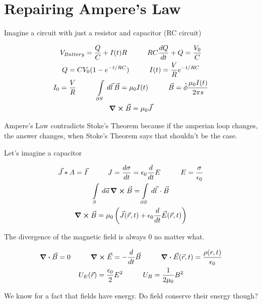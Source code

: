 \documentclass[fleqn]{report}
\newcommand{\hp}{\hspace{1cm}}
\newcommand{\del}{\partial}
\newcommand{\equations} [1] {
\begin{gather*}
#1
\end{gather*}
}
\begin{document}
\section{Repairing Ampere's Law}
Imagine a circuit with just a resistor and capacitor (RC circuit)

\equations{
    V_{Battery}
    = 
    \frac{Q}{C}
    +
    I(t) R 
    \hp 
    RC \frac{dQ}{dt} 
    + Q 
    =
    \frac{V_0}{C}
    \\
    Q 
    =
    C V_0 
    (1 - e^{-t / RC})
    \hp 
    I(t) 
    =
    \frac{V}{R} 
    e^{-t / RC}
    \\
    I_0 = \frac{V}{R} 
    \hp 
    \int\limits_{\del S} \, d \vec l \, 
    \vec B 
    =
    \mu_0 I(t) 
    \hp
    \vec B 
    =
    \hat \phi
    \frac{\mu_0 I(t)}{2 \pi s }
    \\
    \curl \vec B 
    =
    \mu_0 \vec J 
}


Ampere's Law contradicts Stoke's Theorem because if the amperian loop changes, the 
answer changes, when Stoke's Theorem says that shouldn't be the case. 

Let's imagine a capacitor 
\equations{
    \vec J * A 
    =
    \vec I 
    \hp 
    J 
    =
    \frac{d \sigma}{dt}
    =
    \epsilon_0 
    \frac{d}{dt}
    E 
    \hp 
    E = \frac{\sigma}{\epsilon_0}
    \\
    \int\limits_S \, d\vec a \,
    \curl \vec B 
    =
    \int\limits_{\del S} \, d \vec l \, 
    \cdot \vec B 
    \\
    \curl \vec B 
    = 
    \mu_0 
    \left( 
        \vec J(\vec r, t)
        +
        \epsilon_0 
        \frac{d}{dt}
        \vec E(\vec r, t)
    \right)
}

The divergence of the magnetic field is always $0$ no matter what. 

\equations{
    \div \vec B = 0 
    \hp
    \curl \vec E 
    =
    -
    \frac{d}{dt}
    \vec B 
    \hp 
    \div \vec E(\vec r, t)
    =
    \frac{\rho(r, t)}{\epsilon_0}
    \\
    U_E(\vec r )
    =
    \frac{\epsilon_0}{2} 
    E^2 
    \hp 
    U_B 
    =
    \frac{1}{2 \mu_0}
    B^2
}

We know for a fact that fields have energy. Do field conserve their energy 
though?
\end{document}
